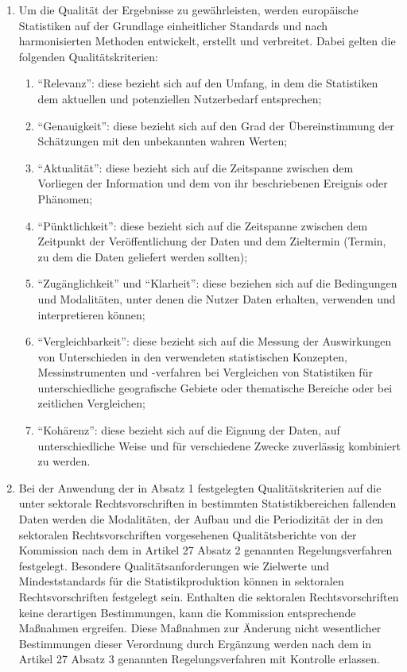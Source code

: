 \documentclass[12pt]{scrbook}
\begin{document}
        \begin{enumerate}[label=(\arabic*)]
            \item Um die Qualität der Ergebnisse zu gewährleisten, werden europäische Statistiken auf der Grundlage einheitlicher Standards und nach harmonisierten Methoden entwickelt, erstellt und verbreitet. Dabei gelten die folgenden Qualitätskriterien:
            \begin{enumerate}
                \item ``Relevanz'': diese bezieht sich auf den Umfang, in dem die Statistiken dem aktuellen und potenziellen Nutzerbedarf entsprechen;
                \item ``Genauigkeit'': diese bezieht sich auf den Grad der Übereinstimmung der Schätzungen mit den unbekannten wahren Werten;
                \item ``Aktualität'': diese bezieht sich auf die Zeitspanne zwischen dem Vorliegen der Information und dem von ihr beschriebenen Ereignis oder Phänomen;
                \item ``Pünktlichkeit'': diese bezieht sich auf die Zeitspanne zwischen dem Zeitpunkt der Veröffentlichung der Daten und dem Zieltermin (Termin, zu dem die Daten geliefert werden sollten);
                \item ``Zugänglichkeit'' und ``Klarheit'': diese beziehen sich auf die Bedingungen und Modalitäten, unter denen die Nutzer Daten erhalten, verwenden und interpretieren können;
                \item ``Vergleichbarkeit'': diese bezieht sich auf die Messung der Auswirkungen von Unterschieden in den verwendeten statistischen Konzepten, Messinstrumenten und -verfahren bei Vergleichen von Statistiken für unterschiedliche geografische Gebiete oder thematische Bereiche oder bei zeitlichen Vergleichen;
                \item ``Kohärenz'': diese bezieht sich auf die Eignung der Daten, auf unterschiedliche Weise und für verschiedene Zwecke zuverlässig kombiniert zu werden.
            \end{enumerate}
            \item Bei der Anwendung der in Absatz 1 festgelegten Qualitätskriterien auf die unter sektorale Rechtsvorschriften in bestimmten Statistikbereichen fallenden Daten werden die Modalitäten, der Aufbau und die Periodizität der in den sektoralen Rechtsvorschriften vorgesehenen Qualitätsberichte von der Kommission nach dem in Artikel 27 Absatz 2 genannten Regelungsverfahren festgelegt.
            Besondere Qualitätsanforderungen wie Zielwerte und Mindeststandards für die Statistikproduktion können in sektoralen Rechtsvorschriften festgelegt sein. Enthalten die sektoralen Rechtsvorschriften keine derartigen Bestimmungen, kann die Kommission entsprechende Maßnahmen ergreifen. Diese Maßnahmen zur Änderung nicht wesentlicher Bestimmungen dieser Verordnung durch Ergänzung werden nach dem in Artikel 27 Absatz 3 genannten Regelungsverfahren mit Kontrolle erlassen.

\end{enumerate}
\end{document}
